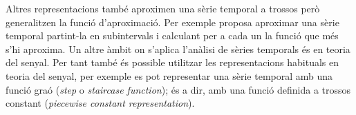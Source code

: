 Altres representacions també aproximen una sèrie temporal a trossos
però generalitzen la funció d'aproximació. Per exemple
\textcite{last01} proposa aproximar una sèrie temporal partint-la en
subintervals i calculant per a cada un la funció que més s'hi
aproxima.  Un altre àmbit on s'aplica l'anàlisi de sèries temporals és
en teoria del senyal.  Per tant també és possible utilitzar les
representacions habituals en teoria del senyal, per exemple es pot
representar una sèrie temporal amb una funció graó (\emph{step} o
\emph{staircase function}); és a dir, amb una funció definida a
trossos constant (\emph{piecewise constant representation}).












